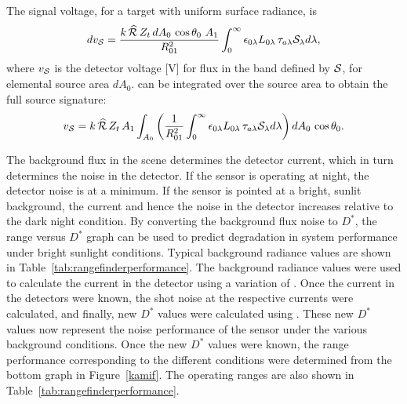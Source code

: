 The signal voltage, for a target with uniform surface radiance, is \cite{Willers2013} 
\begin{equation}
d v_{\cal S}=
\frac{k \,\widehat{{\cal R}}\, Z_t \,dA_{0}\,\cos\theta_0\,
\,A_{1} 
}{R_{01}^2}
\int_{0}^{\infty}
 \epsilon_{0\lambda} L_{0\lambda}
\,\tau_{a\lambda} {\cal S}_\lambda
d\lambda,
\label{eq:sensoroutputvoltage}
\end{equation}
where
$v_{\cal S}$ is the detector voltage [V] for flux in the band defined by ${\cal S}$, for elemental source area $dA_{0}$.   can be integrated over the source area to obtain the full source signature:
\begin{equation}
 v_{\cal S}=
 k \,\widehat{{\cal R}}\, Z_t\,A_{1} 
\int_{A_0} \left(
\frac{1}{R_{01}^2}
\int_{0}^{\infty}
 \epsilon_{0\lambda} L_{0\lambda}
\,\tau_{a\lambda} {\cal S}_\lambda
d\lambda\right) dA_{0}\,\cos\theta_0
.
\label{eq:sensoroutputvoltage1}
\end{equation}


The background flux in the scene determines the detector current, which in turn determines  the noise in the detector. If the sensor is operating at night, the detector noise is at a minimum. If the sensor is pointed at a bright, sunlit background, the current and hence the noise in the detector increases relative to the dark night condition.  By converting the background flux noise to $D^\ast$, the range versus $D^\ast$ graph can be used to predict degradation in system performance under bright sunlight conditions.  Typical background radiance values are shown in Table~\ref{tab:rangefinderperformance}. The background radiance values were used to calculate the current in the detector using a variation of .  Once the current in the detectors were known, the shot noise at the respective currents were calculated, and finally, new $D^\ast$ values were calculated using .  These new $D^\ast$ values now represent the noise performance of the sensor under the various background conditions. Once the new $D^\ast$ values were known, the range performance corresponding to the different conditions were determined from the bottom graph in Figure~\ref{kamif}.  The operating ranges are also shown in Table~\ref{tab:rangefinderperformance}.


